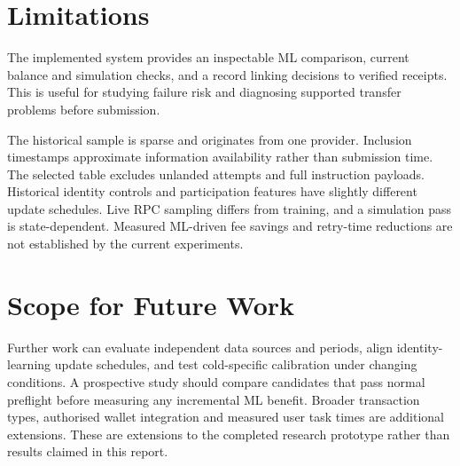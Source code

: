 \documentclass[12pt,a4paper,oneside]{report}
\begin{document}
\section{Limitations}
The implemented system provides an inspectable ML comparison, current balance and simulation checks, and a record linking decisions to verified receipts. This is useful for studying failure risk and diagnosing supported transfer problems before submission.

The historical sample is sparse and originates from one provider. Inclusion timestamps approximate information availability rather than submission time. The selected table excludes unlanded attempts and full instruction payloads. Historical identity controls and participation features have slightly different update schedules. Live RPC sampling differs from training, and a simulation pass is state-dependent. Measured ML-driven fee savings and retry-time reductions are not established by the current experiments.

\section{Scope for Future Work}
Further work can evaluate independent data sources and periods, align identity-learning update schedules, and test cold-specific calibration under changing conditions. A prospective study should compare candidates that pass normal preflight before measuring any incremental ML benefit. Broader transaction types, authorised wallet integration and measured user task times are additional extensions. These are extensions to the completed research prototype rather than results claimed in this report.
\end{document}
